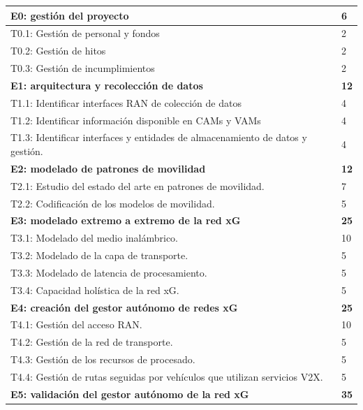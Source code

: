 \documentclass[xcolor=table,xcolor=x11names]{beamer}
\begin{document}
\begin{frame}{\subsecname}
\begin{table}
\begin{adjustbox}{width=.7\textwidth,center}
\begin{tabular}{ p{12cm} | p{2cm}  }
\rowcolor{upmblue!20} \textbf{E0: gestión del proyecto} & \textbf{6} \\ \hline 
T0.1: Gestión de personal y fondos & 2 \\ \hline
T0.2: Gestión de hitos & 2 \\ \hline
T0.3:  Gestión de incumplimientos & 2 \\ \hline
 \rowcolor{upmblue!20} \textbf{E1: arquitectura y recolección de datos} & \textbf{12} \\ \hline 
T1.1: Identificar interfaces RAN de colección de datos & 4 \\ \hline
T1.2: Identificar información disponible en CAMs y VAMs & 4 \\ \hline
T1.3: Identificar interfaces y entidades de almacenamiento de datos y gestión. & 4 \\ \hline
 \rowcolor{upmblue!20}  \textbf{E2: modelado de patrones de movilidad} & \textbf{12} \\ \hline 
T2.1: Estudio del estado del arte en patrones de movilidad. & 7 \\ \hline
T2.2: Codificación de los modelos de movilidad. & 5 \\ \hline
 \rowcolor{upmblue!20}   \textbf{E3: modelado extremo a extremo de la red xG} & \textbf{25} \\ \hline 
T3.1: Modelado del medio inalámbrico. & 10 \\ \hline
T3.2: Modelado de la capa de transporte. & 5 \\ \hline
T3.3: Modelado de latencia de procesamiento. & 5 \\ \hline
T3.4: Capacidad holística de la red xG. & 5 \\ \hline
 \rowcolor{upmblue!20}   \textbf{E4: creación del gestor autónomo de redes xG} & \textbf{25} \\ \hline 
T4.1: Gestión del acceso RAN. & 10 \\ \hline
T4.2: Gestión de la red de transporte. & 5 \\ \hline
T4.3: Gestión de los recursos de procesado. & 5 \\ \hline
T4.4:  Gestión de rutas seguidas por vehículos que utilizan servicios V2X. & 5 \\ \hline
 \rowcolor{upmblue!20}   \textbf{E5: validación del gestor autónomo de la red xG} & \textbf{35} \\ \hline 

\end{tabular}
\end{adjustbox}
\end{table}
\end{frame}
\end{document}
